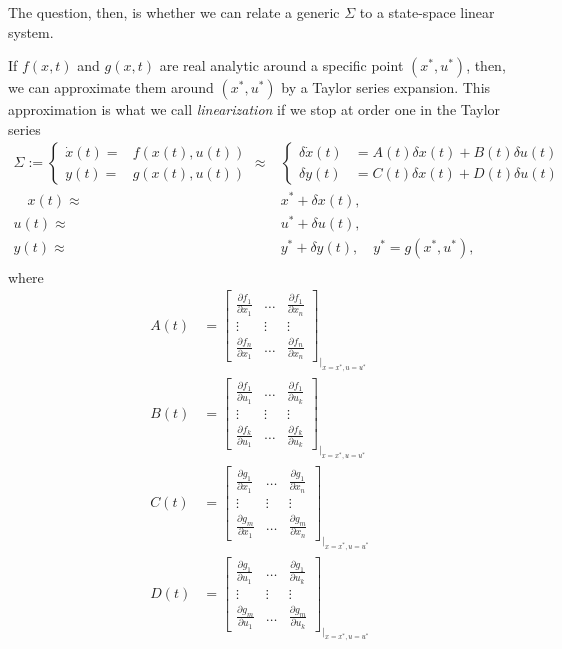 \documentclass[11pt,a4paper,titlepage]{article}
\begin{document}
The question, then, is whether we can relate a generic $\Sigma$ to a state-space linear system.

If $f(x,t)$ and $g(x,t)$ are real analytic around a specific point $(x^*,u^*)$, then, we can approximate them around $(x^*,u^*)$ by a Taylor series expansion. This approximation is what we call \emph{linearization} if we stop at order one in the Taylor series
\begin{align}
	\Sigma := \begin{cases}
	\dot x(t) =& f(x(t),u(t)) \\ y(t) =& g(x(t),u(t))
	\end{cases} \approx&
	\begin{cases}
	\delta \dot x(t) &= A(t)\delta x(t) + B(t)\delta u(t) \\
	\delta y(t) &= C(t)\delta x(t) + D(t)\delta u(t)
	\end{cases} \nonumber \\ \quad x(t) \approx& x^* + \delta x(t), \nonumber \\ u(t)\approx& u^* + \delta u(t), \nonumber \\
	y(t)\approx& y^* + \delta y(t), \quad y^*=g(x^*,u^*),\nonumber \\
\end{align}
where
\begin{align}
	A(t) &= \begin{bmatrix}
		\frac{\partial f_1}{\partial x_1} & \dots & \frac{\partial f_1}{\partial x_n} \\
		\vdots & \vdots & \vdots \\
		\frac{\partial f_n}{\partial x_1} & \dots & \frac{\partial f_n}{\partial x_n}
	\end{bmatrix}_{|_{x=x^*, u=u^*}} \nonumber \\
	B(t) &= \begin{bmatrix}
		\frac{\partial f_1}{\partial u_1} & \dots & \frac{\partial f_1}{\partial u_k} \\
		\vdots & \vdots & \vdots \\
		\frac{\partial f_k}{\partial u_1} & \dots & \frac{\partial f_k}{\partial u_k}
	\end{bmatrix}_{|_{x=x^*, u=u^*}} \nonumber \\
	C(t) &= \begin{bmatrix}
		\frac{\partial g_1}{\partial x_1} & \dots & \frac{\partial g_1}{\partial x_n} \\
		\vdots & \vdots & \vdots \\
		\frac{\partial g_m}{\partial x_1} & \dots & \frac{\partial g_m}{\partial x_n}
	\end{bmatrix}_{|_{x=x^*, u=u^*}} \nonumber \\
	D(t) &= \begin{bmatrix}
		\frac{\partial g_1}{\partial u_1} & \dots & \frac{\partial g_1}{\partial u_k} \\
		\vdots & \vdots & \vdots \\
		\frac{\partial g_m}{\partial u_1} & \dots & \frac{\partial g_m}{\partial u_k}
	\end{bmatrix}_{|_{x=x^*, u=u^*}} \nonumber
\end{align}
\end{document}
